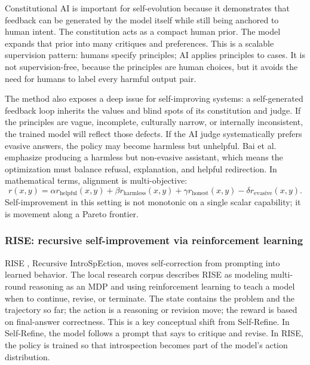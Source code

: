 Constitutional AI is important for self-evolution because it demonstrates that feedback can be generated by the model itself while still being anchored to human intent. The constitution acts as a compact human prior. The model expands that prior into many critiques and preferences. This is a scalable supervision pattern: humans specify principles; AI applies principles to cases. It is not supervision-free, because the principles are human choices, but it avoids the need for humans to label every harmful output pair.

The method also exposes a deep issue for self-improving systems: a self-generated feedback loop inherits the values and blind spots of its constitution and judge. If the principles are vague, incomplete, culturally narrow, or internally inconsistent, the trained model will reflect those defects. If the AI judge systematically prefers evasive answers, the policy may become harmless but unhelpful. Bai et al. emphasize producing a harmless but non-evasive assistant, which means the optimization must balance refusal, explanation, and helpful redirection. In mathematical terms, alignment is multi-objective:
\begin{equation}
    r(x,y)=\alpha r_{\mathrm{helpful}}(x,y)+\beta r_{\mathrm{harmless}}(x,y)+\gamma r_{\mathrm{honest}}(x,y)-\delta r_{\mathrm{evasive}}(x,y).
\end{equation}
Self-improvement in this setting is not monotonic on a single scalar capability; it is movement along a Pareto frontier.

\subsubsection{RISE: recursive self-improvement via reinforcement learning}
\label{subsubsec:rise}

RISE \cite{qu2024rise}, Recursive IntroSpEction, moves self-correction from prompting into learned behavior. The local research corpus describes RISE as modeling multi-round reasoning as an MDP and using reinforcement learning to teach a model when to continue, revise, or terminate. The state contains the problem and the trajectory so far; the action is a reasoning or revision move; the reward is based on final-answer correctness. This is a key conceptual shift from Self-Refine. In Self-Refine, the model follows a prompt that says to critique and revise. In RISE, the policy is trained so that introspection becomes part of the model's action distribution.

